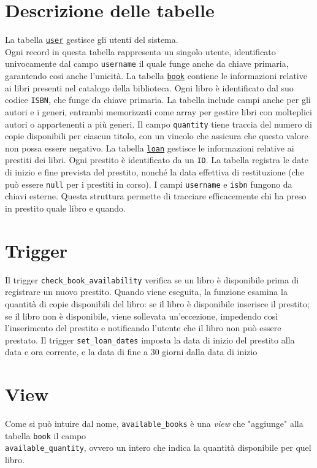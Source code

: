 \documentclass[]{report}
\begin{document}
\section{Descrizione delle tabelle}
La tabella \texttt{\underline{user}} gestisce gli utenti del sistema.\\
Ogni record in questa tabella rappresenta un singolo utente, identificato univocamente dal campo \texttt{username} il quale funge anche da chiave primaria, garantendo cosi anche l'unicità.\bskip
La tabella \texttt{\underline{book}} contiene le informazioni relative ai libri presenti nel catalogo della biblioteca. Ogni libro è identificato dal suo codice \texttt{ISBN}, che funge da chiave primaria. La tabella include campi anche per gli autori e i generi, entrambi memorizzati come array per gestire libri con molteplici autori o appartenenti a più generi. Il campo \texttt{quantity} tiene traccia del numero di copie disponibili per ciascun titolo, con un vincolo che assicura che questo valore non possa essere negativo.\bskip
La tabella \texttt{\underline{loan}} gestisce le informazioni relative ai prestiti dei libri. Ogni prestito è identificato da un \texttt{ID}.\sskip
La tabella registra le date di inizio e fine prevista del prestito, nonché la data effettiva di restituzione (che può essere \texttt{null} per i prestiti in corso).\sskip
I campi \texttt{username} e \texttt{isbn} fungono da chiavi esterne. Questa struttura permette di tracciare efficacemente chi ha preso in prestito quale libro e quando.

\section{Trigger}
Il trigger \texttt{check\_book\_availability} verifica se un libro è disponibile prima di registrare un nuovo prestito.
Quando viene eseguita, la funzione esamina la quantità di copie disponibili del libro:
se il libro è disponibile inserisce il prestito; se il libro non è disponibile, viene sollevata un'eccezione, impedendo così l'inserimento del prestito e notificando l'utente che il libro non può essere prestato.\bskip
Il trigger \texttt{set\_loan\_dates} imposta la data di inizio del prestito alla data e ora corrente, e la data di fine a 30 giorni dalla data di inizio

\section{View}
Come si può intuire dal nome, \texttt{available\_books} è una \textit{view} che "aggiunge" alla tabella \texttt{book} il campo \\
\texttt{available\_quantity}, ovvero un intero che indica la quantità disponibile per quel libro.
\end{document}
